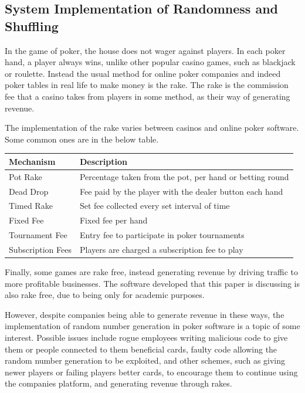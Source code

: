 \newpage{}

\subsection{System Implementation of Randomness and Shuffling}
In the game of poker, the house does not wager against players. In each
poker hand, a player always wins, unlike other popular casino games, such as 
blackjack or roulette. Instead the usual method for online poker companies and
indeed poker tables in real life to make money is the rake. The rake is the 
commission fee that a casino takes from players in some method, as their way 
of generating revenue.

The implementation of the rake varies between casinos and online poker
software. Some common ones are in the below table.

\begin{center}
    \begin{tabular}{l l}
    \toprule
    Mechanism           & Description                                               \\
    \midrule
    Pot Rake            & Percentage taken from the pot, per hand or betting round  \\ \addlinespace
    Dead Drop           & Fee paid by the player with the dealer button each hand   \\ \addlinespace
    Timed Rake          & Set fee collected every set interval of time              \\ \addlinespace
    Fixed Fee           & Fixed fee per hand                                        \\ \addlinespace
    Tournament Fee      & Entry fee to participate in poker tournaments             \\ \addlinespace
    Subscription Fees   & Players are charged a subscription fee to play            \\
    \bottomrule
    \end{tabular}
\end{center}

Finally, some games are rake free, instead generating revenue by driving
traffic to more profitable businesses. The software developed that this paper
is discussing is also rake free, due to being only for academic purposes.

However, despite companies being able to generate revenue in these ways, the
implementation of random number generation in poker software is a topic of
some interest. Possible issues include rogue employees writing malicious
code to give them or people connected to them beneficial cards, faulty code
allowing the random number generation to be exploited, and other schemes, such
as giving newer players or failing players better cards, to encourage them to 
continue using the companies platform, and generating revenue through rakes.

